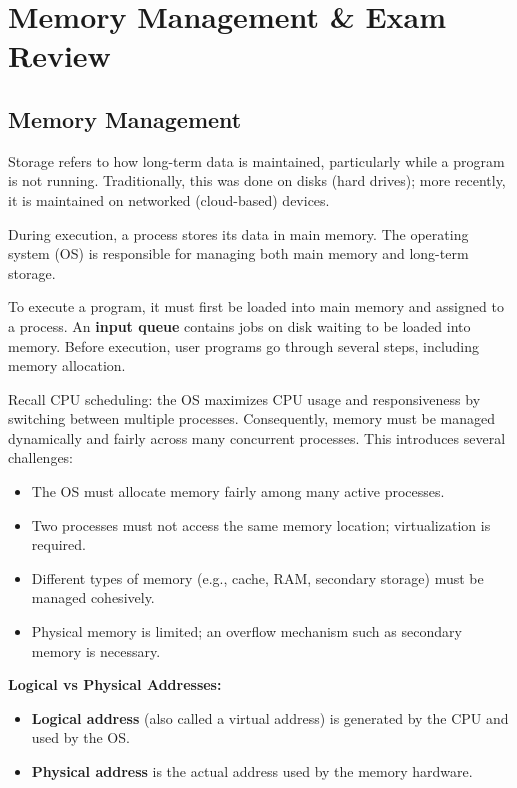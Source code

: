\documentclass[a4paper, 10pt]{article}
\begin{document}
\section{Memory Management \& Exam Review}

\subsection{Memory Management}
\begin{definitionbox}{}{}
    Storage refers to how long-term data is maintained, particularly while a program is not running. Traditionally, this was done on disks (hard drives); more recently, it is maintained on networked (cloud-based) devices.
\end{definitionbox}

During execution, a process stores its data in main memory. The operating system (OS) is responsible for managing both main memory and long-term storage.

To execute a program, it must first be loaded into main memory and assigned to a process. An \textbf{input queue} contains jobs on disk waiting to be loaded into memory. Before execution, user programs go through several steps, including memory allocation.

Recall CPU scheduling: the OS maximizes CPU usage and responsiveness by switching between multiple processes. Consequently, memory must be managed dynamically and fairly across many concurrent processes. This introduces several challenges:

\begin{itemize}
    \item The OS must allocate memory fairly among many active processes.
    \item Two processes must not access the same memory location; virtualization is required.
    \item Different types of memory (e.g., cache, RAM, secondary storage) must be managed cohesively.
    \item Physical memory is limited; an overflow mechanism such as secondary memory is necessary.
\end{itemize}

\textbf{Logical vs Physical Addresses:}
\begin{itemize}
    \item \textbf{Logical address} (also called a virtual address) is generated by the CPU and used by the OS.
    \item \textbf{Physical address} is the actual address used by the memory hardware.
\end{itemize}
\end{document}
